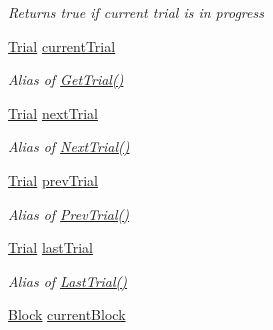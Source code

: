\begin{DoxyCompactItemize}
\begin{DoxyCompactList}\small\item\em Returns true if current trial is in progress \end{DoxyCompactList}\item 
\hyperlink{class_exp_mngr_1_1_trial}{Trial} \hyperlink{class_exp_mngr_1_1_experiment_session_a1015e2b8fb07a934a8525522035b6e31}{current\+Trial}
\begin{DoxyCompactList}\small\item\em Alias of \hyperlink{class_exp_mngr_1_1_experiment_session_af4c8f8f7fc233ae747177b8ec7e7ab68}{Get\+Trial()} \end{DoxyCompactList}\item 
\hyperlink{class_exp_mngr_1_1_trial}{Trial} \hyperlink{class_exp_mngr_1_1_experiment_session_ae226dce79f34600e46f4614e9656dfde}{next\+Trial}
\begin{DoxyCompactList}\small\item\em Alias of \hyperlink{class_exp_mngr_1_1_experiment_session_a607ca5ace08b787b754c54476069fa00}{Next\+Trial()} \end{DoxyCompactList}\item 
\hyperlink{class_exp_mngr_1_1_trial}{Trial} \hyperlink{class_exp_mngr_1_1_experiment_session_ae3c09a0d370d1da4dbae484aa7261356}{prev\+Trial}
\begin{DoxyCompactList}\small\item\em Alias of \hyperlink{class_exp_mngr_1_1_experiment_session_ae5fe61e3f2d63bd05658655d97d1c17b}{Prev\+Trial()} \end{DoxyCompactList}\item 
\hyperlink{class_exp_mngr_1_1_trial}{Trial} \hyperlink{class_exp_mngr_1_1_experiment_session_a85631d5f2c807a34ba0f6f29fa12c9a7}{last\+Trial}
\begin{DoxyCompactList}\small\item\em Alias of \hyperlink{class_exp_mngr_1_1_experiment_session_a7f3fc46b3284c9739f8b1805d23f737a}{Last\+Trial()} \end{DoxyCompactList}\item 
\hyperlink{class_exp_mngr_1_1_block}{Block} \hyperlink{class_exp_mngr_1_1_experiment_session_a9318c2ad628b5a7fa08e145c7a054043}{current\+Block}

\end{DoxyCompactItemize}
